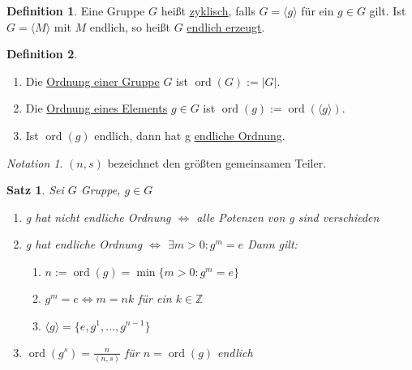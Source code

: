 \documentclass[12pt]{scrartcl}%
\newtheorem{thm}{Satz}
\theoremstyle{definition}
\newtheorem*{defn}{Definition}
\theoremstyle{remark}
\newtheorem*{notation}{Notation}
\DeclareMathOperator\ord{ord}
\begin{document}
\begin{defn}
	Eine Gruppe $G$ heißt \underline{zyklisch}, falls $G = \langle g \rangle$ für ein $g \in G$ gilt. \newline
	Ist $G = \langle M \rangle$ mit $M$ endlich, so heißt $G$ \underline{endlich erzeugt}.
\end{defn}

\begin{defn}
	\begin{enumerate}[label=(\roman*)]
		\item Die \underline{Ordnung einer Gruppe} $G$ ist $\ord(G):=\vert G \vert$.
		\item Die \underline{Ordnung eines Elements} $g \in G$ ist $\ord(g):=\ord(\langle g \rangle)$.
		\item Ist $\ord(g)$ endlich, dann hat g \underline{endliche Ordnung}.
	\end{enumerate}
\end{defn}

\begin{notation}
    $(n,s)$ bezeichnet den größten gemeinsamen Teiler.
\end{notation}

\begin{thm}
	Sei $G$ Gruppe, $g \in G$
	\begin{enumerate}
		\item g hat nicht endliche Ordnung $\Longleftrightarrow$ alle Potenzen von g sind verschieden
		\item g hat endliche Ordnung $\Longleftrightarrow$ $\exists m>0: g^{m}=e$ \newline Dann gilt:
			\begin{enumerate}[label=(\alph*)]
				\item $n := \ord(g) = \min \lbrace m>0 : g^{m}=e \rbrace$
				\item $g^{m}=e \Longleftrightarrow m=nk$ für ein $k \in \mathbb{Z}$
				\item $\langle g \rangle = \lbrace e, g^{1},...,g^{n-1}\rbrace$
			\end{enumerate}
		\item $\ord(g^{s}) = \frac{n}{(n,s)}$ für $n = \ord(g)$ endlich
	\end{enumerate}
\end{thm}
\end{document}
